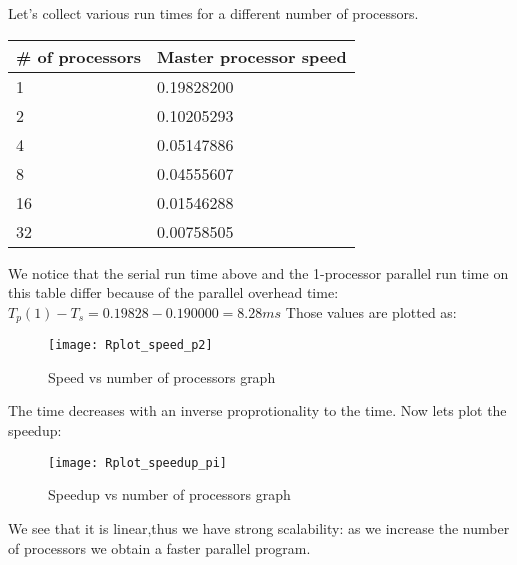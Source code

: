 \documentclass[11pt]{scrartcl} %
\begin{document}
Let's collect various run times for a different number of processors.
\begin{adjustwidth}{2cm}{}
	\begin{tabular}[h]{l|l }
		\hline
			\# of processors&Master processor speed\\
			\hline
			1&0.19828200\\
			2&0.10205293\\
			4&0.05147886\\
			8&0.04555607\\
			16&0.01546288\\
			32&0.00758505\\
		\end{tabular}
	\end{adjustwidth}
We notice that the serial run time above and the 1-processor parallel run time on this table differ because of the parallel overhead time: $T_p(1)-T_s= 0.19828-0.190000 = 8.28 ms$
Those values are plotted as:
\begin{figure}[H] %
	\centering
	\texttt{[image: Rplot\_speed\_p2]} %
	\caption{Speed vs number of processors graph}
\end{figure}

The time decreases with an inverse proprotionality to the time. Now lets plot the speedup: 
\begin{figure}[H] %
	\centering
	\texttt{[image: Rplot\_speedup\_pi]} %
	\caption{Speedup vs number of processors graph}
\end{figure}
We see that it is linear,thus we have strong scalability: as we increase the number of processors we obtain a faster parallel program.
\end{document}
